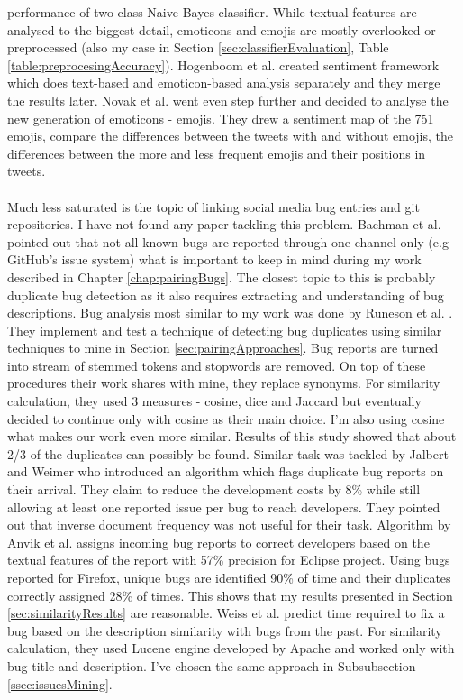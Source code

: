 performance of two-class Naive Bayes classifier. While textual features are analysed to the biggest detail, emoticons and emojis are mostly overlooked or preprocessed (also my case in Section \ref{sec:classifierEvaluation}, Table \ref{table:preprocesingAccuracy}). Hogenboom et al.\cite{hogenboom2013exploiting} created sentiment framework which does text-based and emoticon-based analysis separately and they merge the results later. Novak et al. \cite{novak2015sentiment} went even step further and decided to analyse the new generation of emoticons - emojis. They drew a sentiment map of the 751 emojis, compare the differences between the tweets with and without emojis, the differences between the more and less frequent emojis and their positions in tweets.\\
\\
Much less saturated is the topic of linking social media bug entries and  git repositories. I have not found any paper tackling this problem. Bachman et al. \cite{bachmann2010missing} pointed out that not all known bugs are reported through one channel only (e.g GitHub's issue system) what is important to keep in mind during my work described in Chapter \ref{chap:pairingBugs}. The closest topic to this is probably duplicate bug detection as it also requires extracting and understanding of bug descriptions.  Bug analysis most similar to my work was done by Runeson et al. \cite{runeson2007detection}. They implement and test a technique of detecting bug duplicates using similar techniques to mine in Section \ref{sec:pairingApproaches}. Bug reports are turned into stream of stemmed tokens and stopwords are removed. On top of these procedures their work shares with mine, they replace synonyms. For similarity calculation, they used 3 measures - cosine, dice and Jaccard but eventually decided to continue only with cosine as their main choice. I'm also using cosine what makes our work even more similar. Results of this study showed that about 2/3 of the duplicates can possibly be found. Similar task was tackled by Jalbert and Weimer \cite{jalbert2008automated} who introduced an algorithm which flags duplicate bug reports on their arrival. They claim to reduce the development costs by 8\% while still allowing at least one reported issue per bug to reach developers. They pointed out that inverse document frequency was not useful for their task. Algorithm by Anvik et al. \cite{anvik2005coping} assigns incoming bug reports to correct developers based on the textual features of the report with 57\% precision for Eclipse project. Using bugs reported for Firefox, unique bugs are identified 90\% of time and their duplicates correctly assigned 28\% of times. This shows that my results presented in Section \ref{sec:similarityResults} are reasonable. Weiss et al. \cite{weiss2007long} predict time required to fix a bug based on the description similarity with bugs from the past. For similarity calculation, they used Lucene engine developed by Apache and worked only with bug title and description. I've chosen the same approach in Subsubsection \ref{ssec:issuesMining}.

